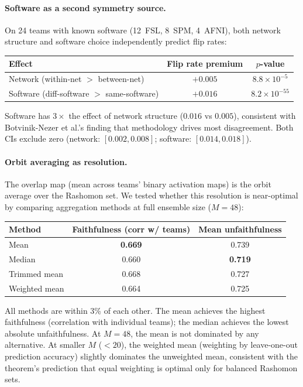 \documentclass[11pt,a4paper]{article}
\begin{document}
\paragraph{Software as a second symmetry source.}
On 24 teams with known software (12~FSL, 8~SPM, 4~AFNI), both network structure and software choice independently predict flip rates:
\begin{center}
\small
\begin{tabular}{lcc}
\toprule
Effect & Flip rate premium & $p$-value \\
\midrule
Network (within-net $>$ between-net) & $+0.005$ & $8.8 \times 10^{-5}$ \\
Software (diff-software $>$ same-software) & $+0.016$ & $8.2 \times 10^{-55}$ \\
\bottomrule
\end{tabular}
\end{center}
Software has $3\times$ the effect of network structure ($0.016$ vs $0.005$), consistent with Botvinik-Nezer et al.'s finding that methodology drives most disagreement.  Both CIs exclude zero (network: $[0.002, 0.008]$; software: $[0.014, 0.018]$).

\paragraph{Orbit averaging as resolution.}
The overlap map (mean across teams' binary activation maps) is the orbit average over the Rashomon set.  We tested whether this resolution is near-optimal by comparing aggregation methods at full ensemble size ($M = 48$):
\begin{center}
\small
\begin{tabular}{lcc}
\toprule
Method & Faithfulness (corr w/ teams) & Mean unfaithfulness \\
\midrule
Mean & \textbf{0.669} & 0.739 \\
Median & 0.660 & \textbf{0.719} \\
Trimmed mean & 0.668 & 0.727 \\
Weighted mean & 0.664 & 0.725 \\
\bottomrule
\end{tabular}
\end{center}
All methods are within 3\% of each other.  The mean achieves the highest faithfulness (correlation with individual teams); the median achieves the lowest absolute unfaithfulness.  At $M = 48$, the mean is not dominated by any alternative.  At smaller $M$ ($< 20$), the weighted mean (weighting by leave-one-out prediction accuracy) slightly dominates the unweighted mean, consistent with the theorem's prediction that equal weighting is optimal only for balanced Rashomon sets.
\end{document}
